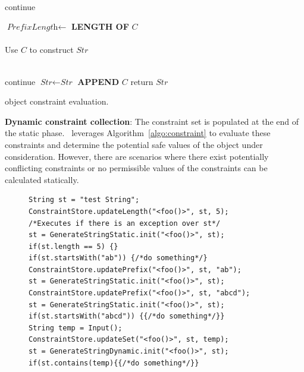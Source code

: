\begin{mylist}
\begin{algorithm}[t]
{     {
         {\\
          \mytab continue
        }
        
        $\textit{PrefixLength} \longleftarrow$ {\bf LENGTH OF} $C$\\
        
         {\\
          \mytab  Use $C$ to construct $\textit{Str}$
        }
    }

     {
         {\\
          \mytab  continue
        }
        $\textit{Str} \leftarrow \textit{Str}$ {\bf APPEND} $C$
    }
    return $\textit{Str}$
}
\caption{ object constraint evaluation.}
\label{algo:constraint}
\end{algorithm}

 \item \textbf{Dynamic constraint collection}: The constraint set is populated
at the end of the static phase. \tool\ leverages Algorithm~\ref{algo:constraint}
to evaluate these constraints and determine the potential safe values of the
 object under consideration. However, there are scenarios where
there exist potentially conflicting constraints or no permissible values of the
constraints can be calculated statically.


\begin{figure}[!htb]
\begin{lstlisting}
String st = "test String";
ConstraintStore.updateLength("<foo()>", st, 5);
/*Executes if there is an exception over st*/
st = GenerateStringStatic.init("<foo()>", st);
if(st.length == 5) {}
if(st.startsWith("ab")) {/*do something*/}
ConstraintStore.updatePrefix("<foo()>", st, "ab");
st = GenerateStringStatic.init("<foo()>", st);
ConstraintStore.updatePrefix("<foo()>", st, "abcd");
st = GenerateStringStatic.init("<foo()>", st);
if(st.startsWith("abcd")) {{/*do something*/}}
String temp = Input();
ConstraintStore.updateSet("<foo()>", st, temp);
st = GenerateStringDynamic.init("<foo()>", st);
if(st.contains(temp){{/*do something*/}}
\end{lstlisting}
\end{figure}


\end{mylist}
